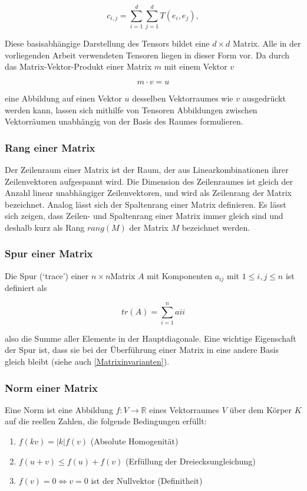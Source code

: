 \documentclass[a4paper,fontsize=12pt,toc=bib,halfparskip]{scrartcl}
\begin{document}
\begin{equation}
	c_{i,j} = \sum_{i=1}^{d} \sum_{j=1}^{d} T(e_i, e_j),  
\end{equation}

Diese basisabh\"angige Darstellung des Tensors bildet eine $d\times d$ Matrix. Alle in der vorliegenden Arbeit verwendeten Tensoren liegen in dieser Form vor. Da durch das Matrix-Vektor-Produkt einer Matrix $m$ mit einem Vektor $v$

\begin{equation}
	m \cdot v = u
\end{equation} 

eine Abbildung auf einen Vektor $u$ desselben Vektorraumes wie $v$ ausgedr\"uckt werden kann, lassen sich mithilfe von Tensoren Abbildungen zwischen Vektorr\"aumen unabh\"angig von der Basis des Raumes formulieren.

\subsubsection{Rang einer Matrix}
Der Zeilenraum einer Matrix ist der Raum, der aus Linearkombinationen ihrer Zeilenvektoren aufgespannt wird. Die Dimension des Zeilenraumes ist gleich der Anzahl linear unabh\"angiger Zeilenvektoren, und wird als Zeilenrang der Matrix bezeichnet. Analog l\"asst sich der Spaltenrang einer Matrix definieren. Es l\"asst sich zeigen, dass Zeilen- und Spaltenrang einer Matrix immer gleich sind und deshalb kurz als Rang $rang(M)$ der Matrix $M$ bezeichnet werden.

\subsubsection{Spur einer Matrix}
Die Spur (`trace') einer $n\times n$Matrix $A$ mit Komponenten $a_{ij}$ mit $1 \leq i,j \leq n$ ist definiert als

\begin{equation}
	tr(A) = \sum_{i = 1}^{n} a{ii}
\end{equation}

also die Summe aller Elemente in der Hauptdiagonale. Eine wichtige Eigenschaft der Spur ist, dass sie bei der \"Uberf\"uhrung einer Matrix in eine andere Basis gleich bleibt (siehe auch \ref{Matrixinvarianten}).


\subsubsection{Norm einer Matrix}
Eine Norm ist eine Abbildung $f: V \rightarrow \mathbb{R}$ eines Vektorraumes $V$ \"uber dem K\"orper $K$ auf die reellen Zahlen, die folgende Bedingungen erf\"ullt:
\begin{enumerate}
	\item $f(kv) = |k|f(v)$ (Absolute Homogenit\"at)
	\item $f(u+v) \leq f(u) + f(v)$ (Erf\"ullung der Dreiecksungleichung)
	\item $f(v) = 0 \iff v=0$ ist der Nullvektor (Definitheit)
\end{enumerate}
\end{document}
